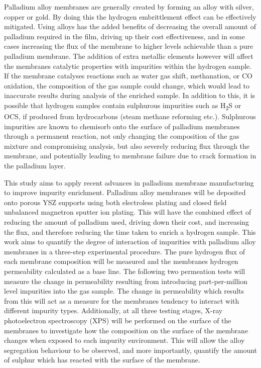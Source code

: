 Palladium alloy membranes are generally created by forming an alloy with silver, copper or gold. By doing this the hydrogen embrittlement effect can be effectively mitigated. Using alloys has the added benefits of decreasing the overall amount of palladium required in the film, driving up their cost effectiveness, and in some cases increasing the flux of the membrane to higher levels achievable than a pure palladium membrane. The addition of extra metallic elements however will affect the membranes catalytic properties with impurities within the hydrogen sample. If the membrane catalyses reactions such as water gas shift, methanation, or CO oxidation, the composition of the gas sample could change, which would lead to inaccurate results during analysis of the enriched sample. In addition to this, it is possible that hydrogen samples contain sulphurous impurities such as H\textsubscript{2}S or OCS, if produced from hydrocarbons (steam methane reforming etc.). Sulphurous impurities are known to chemisorb onto the surface of palladium membranes through a permanent reaction, not only changing the composition of the gas mixture and compromising analysis, but also severely reducing flux through the membrane, and potentially leading to membrane failure due to crack formation in the palladium layer.

This study aims to apply recent advances in palladium membrane manufacturing to improve impurity enrichment. Palladium alloy membranes will be deposited onto porous YSZ supports using both electroless plating and closed field unbalanced magnetron sputter ion plating. This will have the combined effect of reducing the amount of palladium used, driving down their cost, and  increasing the flux, and therefore reducing the time taken to enrich a hydrogen sample. This work aims to quantify the degree of interaction of impurities with palladium alloy membranes in a three-step experimental procedure. The pure hydrogen flux of each membrane composition will be measured and the membranes hydrogen permeability calculated as a base line. The following two permeation tests will measure the change in permeability resulting from introducing part-per-million level impurities into the gas sample. The change in permeability which results from this will act as a measure for the membranes tendency to interact with different impurity types. Additionally, at all three testing stages, X-ray photoelectron spectroscopy (XPS) will be performed on the surface of the membranes to investigate how the composition on the surface of the membrane changes when exposed to each impurity environment. This will allow the alloy segregation behaviour to be observed, and more importantly, quantify the amount of sulphur which has reacted with the surface of the membrane. 

